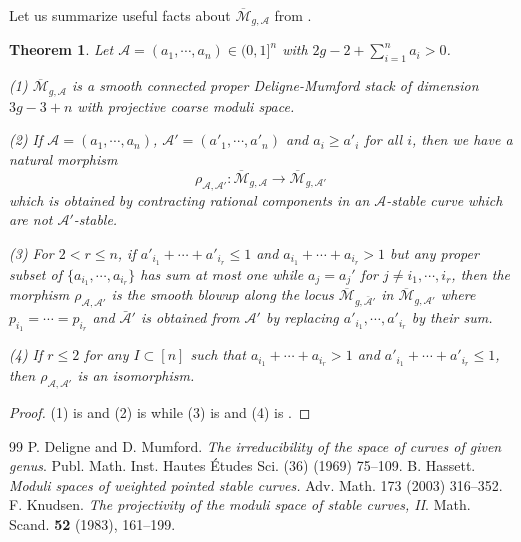 \documentclass[10pt,a4paper]{amsart}
\numberwithin{equation}{section}
\newtheorem{theo}{Theorem}[section]
\def\cA{{\mathcal A}}
\def\cM{{\mathcal M}}
\def\lra{\longrightarrow }
\def\beq{\begin{equation}}
\def\eeq{\end{equation}}
\def\bcM{\overline{\cM}}
\begin{document}
\medskip

Let us summarize useful facts about $\bcM_{g,\cA}$ from \cite{Hst}.

\begin{theo}\label{2} 
Let $\cA=(a_1,\cdots,a_n)\in (0,1]^n$ with $2g-2+\sum_{i=1}^n a_i>0$.

(1) $\bcM_{g,\cA}$ is a smooth connected proper Deligne-Mumford stack of dimension $3g-3+n$ with projective coarse moduli space.  

(2) If $\cA=(a_1,\cdots,a_n)$, $\cA'=(a'_1,\cdots, a'_n)$ and $a_i\ge a'_i$ for all $i$, then we have a natural morphism 
\beq\label{1} \rho_{\cA,\cA'}:\bcM_{g,\cA}\lra \bcM_{g,\cA'}\eeq 
which is obtained by contracting rational components in an $\cA$-stable curve which are not $\cA'$-stable. 

(3) For $2<r\le n$, if $a'_{i_1}+\cdots+a'_{i_r}\le 1$  and $a_{i_1}+\cdots+a_{i_r}>1$ but any proper subset  of $\{a_{i_1},\cdots, a_{i_r}\}$ has sum at most one while $a_j=a_j'$ for $j\ne i_1,\cdots,i_r$, then the morphism $\rho_{\cA,\cA'}$ is the smooth blowup along the locus $\bcM_{g,\bar \cA'}$ in $\bcM_{g,\cA'}$ where $p_{i_1}=\cdots=p_{i_r}$ and $\bar \cA'$ is obtained from $\cA'$ by replacing $a'_{i_1}, \cdots, a'_{i_r}$ by their sum. 

(4) If $r\le 2$ for any $I\subset [n]$ such that $a_{i_1}+\cdots+a_{i_r}>1$ and $a'_{i_1}+\cdots+a'_{i_r}\le 1$, then $\rho_{\cA,\cA'}$ is an isomorphism. 
\end{theo}

\begin{proof}
    (1) is \cite[Theorem 2.1]{Hst} and (2) is \cite[Theorem 4.1]{Hst} while (3) is \cite[Remark 4.6]{Hst} and (4) is \cite[Corollary 4.7]{Hst}. 
\end{proof}

\begin{thebibliography}{99}
 P. Deligne and D. Mumford. {\em The irreducibility of the space of curves of given genus}. Publ. Math. Inst. Hautes Études Sci. (36) (1969) 75–109.
 B. Hassett. {\em Moduli spaces of weighted pointed stable curves.} Adv. Math. 173 (2003) 316–352.
 F. Knudsen. {\em The projectivity of the moduli space of stable curves, II}. Math. Scand. \textbf{52} (1983), 161--199.
\end{thebibliography}
\end{document}
